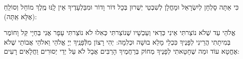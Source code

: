 \documentclass[twoside, openany, parskip=half, 11pt]{book}
\begin{document}
כִּי אַתָּה סָלְחָן לְיִשְׂרָאֵל וּמָחֳלָן לְשִׁבְטֵי יְשֻׁרוּן בְּכָל דּוֹר וָדוֹר 
וּמִבַּלְעָדֶיךָ אֵין לָֽנּוּ מֶֽלֶךְ מוֹחֵל וְסוֹלֵֽחַ (אֶלָּא אַֽתָּה):

 אֱלֹהַי עַד שֶׁלֹא נוֹצַרתִּי אֵינִי כְּדַאי וְעַכְשָׁיו שֶׁנוֹצַרתִּי כְּאִלוּ לֹא נוֹצַרתִּי עָפָר אֲנִי בְּחַיָי קַּל וָחוֹמֶר בְּמִיתָתִי הֲרֵינִי לְפָּנֶיךָ כִּכְלֵי מָלֵא בוּשָׁה וּכְלִמָה: יְהִי רָצוֹן מִלְּֿפָנֶֽיךָ יְיָ אֱלֹהַי וֵאלֹהֵי אֲבוֹתַי שֶׁלֹא אֶחֱטָא עוֹד וּמַה שֶׁחָטָאתִי לְפָנֶיךָ מְחוֹק בְּרַחֲמֶיךָ הָרַבִּים אֲבָל לֹא עַל יְדֵי יְסוּרִים וַחֲלָאִים רָעִים:
 
\vfill
\sepline 

 

 


\end{document}
